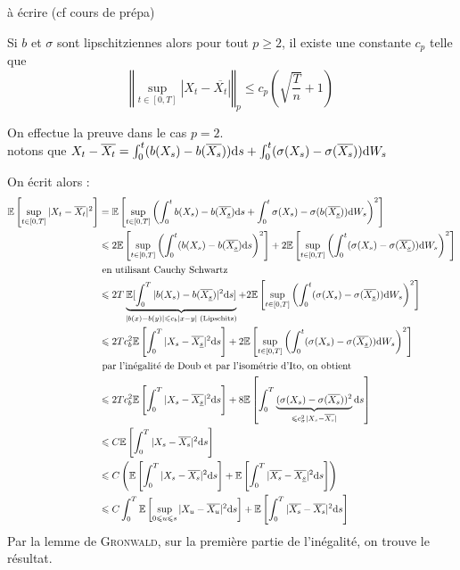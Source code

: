 \Preuve à écrire (cf cours de prépa)

\begin{prop}
  Si $b$ et $\sigma$ sont lipschitziennes alors pour tout $p \geq 2$, il existe une constante $c_{p}$ telle que 
  \[ \left\Vert \sup_{t \in [0,T]} \left\vert X_t - \overline{X_t} \right\vert \right\Vert_p \leq c_p \left( \sqrt{ \frac{T}{n}} + 1 \right) \] 
\end{prop}

On effectue la preuve dans le cas $p=2$. \\

\Preuve notons que $X_t - \overline{X_t} = \int_{0}^{t} (b(X_s) -b(\overline{X_s})) \mathrm{d} s + \int_{0}^{t} (\sigma(X_s) - \sigma(\overline{X_s})) \mathrm{d} W_s$ 

On écrit alors :
\newcommand{\xsb}{\overline{X_{\underline{s}}}}
\begin{equation*}
\begin{split}
  \E\left[ \sup_{t \in [0,T]} \vert X_t - \overline{X_t} \vert^2 \right] &= \E\left[ \sup_{t \in [0,T]} \left( \int_{0}^{t} b(X_s) - b(\xsb) \der s + \int_{0}^{t} \sigma(X_s) - \sigma(b(\xsb)) \der W_s \right)^2 \right] \\
  &\leq 2 \E\left[\sup_{t \in [0,T]} \left( \int_{0}^{t} (b(X_s) - b(\xsb) \der s\right)^2\right] + 2 \E\left[\sup_{t \in [0,T]} \left( \int_{0}^{t} (\sigma(X_s) - \sigma(\xsb)) \der W_s\right)^2\right] \\
  &\text{ en utilisant Cauchy Schwartz} \\
  &\leq 2T\underbrace{ \E[ \int_{0}^{T}  \vert b(X_s) - b(\xsb) \vert^2 \der s]}_{ \vert b(x) - b(y) \vert \leq c_b \vert x -y \vert \text{ (Lipschitz)} } + 2 \E\left[ \sup_{t \in [0,T]} \left( \int_{0}^{t} (\sigma(X_s) - \sigma(\xsb)) \der W_s \right)^2\right] \\
  &\leq 2Tc_b^2 \E\left[ \int_{0}^{T}  \vert X_s - \xsb \vert^2 \der s\right] + 2 \E\left[ \sup_{t \in [0,T]} \left( \int_{0}^{t} (\sigma(X_s) - \sigma(\xsb)) \der W_s \right)^2\right]  \\
  &\text{ par l'inégalité de Doub et par l'isométrie d'Ito, on obtient}  \\
  &\leq 2Tc_b^2 \E\left[ \int_{0}^{T}  \vert X_s - \xsb \vert^2 \der s\right] + 8\E\left[ \int_{0}^{T} \underbrace{(\sigma(X_s) - \sigma(\overline{X_s}))^2}_{\leq c_\sigma^2 \vert X_s - \overline{X_s} \vert} \der s\right] \\
  &\leq C \E\left[ \int_{0}^{T} \vert X_s - \overline{X_s} \vert^2 \der s \right] \\
  &\leq C \left(\E\left[ \int_{0}^{T}  \vert X_s - \overline{X_s} \vert^2 \der s \right] + \E\left[ \int_{0}^{T} \vert \overline{X_s} - \xsb \vert^2 \der s \right]\right) \\
  &\leq C \int_{0}^{T} \E\left[\sup_{0 \leq u \leq s } \vert X_u - \overline{X_u} \vert^2 \der s \right] +  \E\left[ \int_{0}^{T} \vert \overline{X_s} - \overline{X_s} \vert^2 \der s\right]
\end{split}
\end{equation*}
Par la lemme de \textsc{Gronwald}, sur la première partie de l'inégalité, on trouve le résultat.

